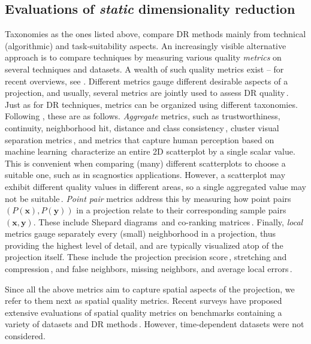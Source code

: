 \subsection{Evaluations of \emph{static} dimensionality reduction}
\label{sec:eval_static}
%
Taxonomies as the ones listed above, compare DR methods mainly from technical (algorithmic) and task-suitability aspects. An increasingly visible alternative approach is to compare techniques by measuring various quality \emph{metrics} on several techniques and datasets. A wealth of such quality metrics exist -- for recent overviews, see \cite{polzlbauer04_survey,Lee2009,lueks13,nonato_survey,EspadotoSurvey}. Different metrics gauge different desirable aspects of a projection, and usually, several metrics are jointly used to assess DR quality\,\cite{gisbrecht15}. Just as for DR techniques, metrics can be organized using different taxonomies. Following \cite{EspadotoSurvey}, these are as follows. \emph{Aggregate} metrics, such as trustworthiness, continuity, neighborhood hit, distance and class consistency\,\cite{sips09,tatu10}, cluster visual separation metrics\,\cite{albuquerque11,sedlmair13,sedlmair15}, and metrics that capture human perception based on machine learning\,\cite{sedlmair16} characterize an entire 2D scatterplot by a single scalar value. This is convenient when comparing (many) different scatterplots to choose a suitable one, such as in scagnostics applications. However, a scatterplot may exhibit different quality values in different areas, so a single aggregated value may not be suitable\,\cite{lamp,nonato_survey}. \emph{Point pair} metrics address this by measuring how point pairs $(P(\mathbf{x}), P(\mathbf{y}))$ in a projection relate to their corresponding sample pairs $(\mathbf{x}, \mathbf{y})$. These include Shepard diagrams\,\cite{lamp} and co-ranking matrices\,\cite{Lee2009}. Finally, \emph{local} metrics gauge separately every (small) neighborhood in a projection, thus providing the highest level of detail, and are typically visualized atop of the projection itself. These include the projection precision score\,\cite{schreck10}, stretching and compression\,\cite{aupetit07,lespinats11}, and false neighbors, missing neighbors, and average local errors\,\cite{Martins2014,Martins2015}.

Since all the above metrics aim to capture spatial aspects of the projection, we refer to them next as spatial quality metrics. Recent surveys have proposed extensive evaluations of spatial quality metrics on benchmarks containing a variety of datasets and DR methods\,\cite{EspadotoSurvey,vandermaaten2009dimensionality}. However, time-dependent datasets were not considered.

